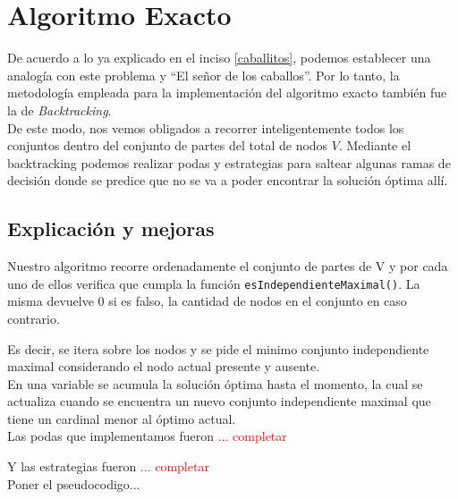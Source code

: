 \section{Algoritmo Exacto}
De acuerdo a lo ya explicado en el inciso \ref{caballitos}, podemos establecer una analog\'ia con este problema y ``El se\~nor de los caballos''. Por lo tanto, la metodolog\'ia empleada para la implementaci\'on del algoritmo exacto tambi\'en fue la de \emph{Backtracking}.\\

De este modo, nos vemos obligados a recorrer inteligentemente todos los conjuntos dentro del conjunto de partes del total de nodos $V$. Mediante el backtracking podemos realizar podas y estrategias para saltear algunas ramas de decisi\'on donde se predice que no se va a poder encontrar la soluci\'on \'optima all\'i.


\subsection{Explicaci\'on y mejoras}

Nuestro algoritmo recorre ordenadamente el conjunto de partes de V y por cada uno de ellos verifica que cumpla la funci\'on  \texttt{esIndependienteMaximal()}. La misma devuelve 0 si es falso, la cantidad de nodos en el conjunto en caso contrario.

Es decir, se itera sobre los nodos y se pide el minimo conjunto independiente maximal considerando el nodo actual presente y ausente.\\

En una variable se acumula la soluci\'on \'optima hasta el momento, la cual se actualiza cuando se encuentra un nuevo conjunto independiente maximal que tiene un cardinal menor al \'optimo actual.\\

Las podas que implementamos fueron \textcolor{red}{... completar}

Y las estrategias fueron \textcolor{red}{... completar}\\

Poner el pseudocodigo...





